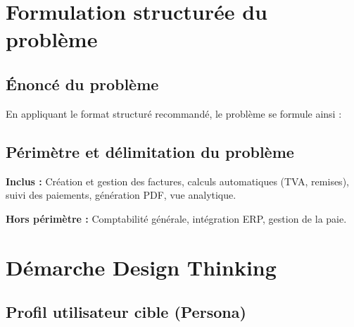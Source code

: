 \section{Formulation structurée du problème}

\subsection{Énoncé du problème}

En appliquant le format structuré recommandé, le problème se formule ainsi :

\begin{center}
\end{center}

\subsection{Périmètre et délimitation du problème}

\textbf{Inclus :} Création et gestion des factures, calculs automatiques (TVA, remises), suivi des paiements, génération PDF, vue analytique.

\textbf{Hors périmètre :} Comptabilité générale, intégration ERP, gestion de la paie.

\section{Démarche Design Thinking}

\subsection{Profil utilisateur cible (Persona)}

